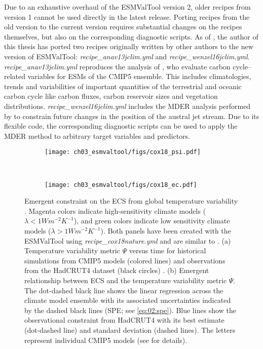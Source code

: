 Due to an exhaustive overhaul of the \ac{ESMValTool} version 2, older recipes
from version 1 \autocite{Eyring2016a} cannot be used directly in the latest
release. Porting recipes from the old version to the current version requires
substantial changes on the recipes themselves, but also on the corresponding
diagnostic scripts. As of \TheMonth{}, the author of this thesis has ported two
recipes originally written by other authors to the new version of
\ac{ESMValTool}: \emph{recipe\_anav13jclim.yml} and
\emph{recipe\_wenzel16jclim.yml}. \emph{recipe\_anav13jclim.yml} reproduces the
analysis of \textcite{Anav2013}, who evaluate carbon cycle--related variables
for \acp{ESM} of the \acs{CMIP}5 ensemble. This includes climatologies, trends
and variabilities of important quantities of the terrestrial and oceanic carbon
cycle like carbon fluxes, carbon reservoir sizes and vegetation distributions.
\emph{recipe\_wenzel16jclim.yml} includes the \ac{MDER} analysis performed by
\textcite{Wenzel2016a} to constrain future changes in the position of the
austral jet stream. Due to its flexible code, the corresponding diagnostic
scripts can be used to apply the \ac{MDER} method to arbitrary target variables
and predictors.

\begin{figure}[t]
  \centering
  \begin{subfigure}[b]{\SubfigureWidth{}}
    \texttt{[image: ch03\_esmvaltool/figs/cox18\_psi.pdf]}
    \caption{}
    \label{fig:03:cox18:a}
  \end{subfigure}
  ~
  \begin{subfigure}[b]{\SubfigureWidth{}}
    \texttt{[image: ch03\_esmvaltool/figs/cox18\_ec.pdf]}
    \caption{}
    \label{fig:03:cox18:b}
  \end{subfigure}
  \caption{Emergent constraint on the \acf{ECS} from global temperature
    variability \autocite{Cox2018}. Magenta colors indicate high-sensitivity
    climate models ($\lambda < 1 \unit{W m^{-2} K^{-1}}$), and green colors
    indicate low sensitivity climate models ($\lambda > 1 \unit{W m^{-2}
      K^{-1}}$). Both panels have been created with the \acs{ESMValTool} using
    \emph{recipe\_cox18nature.yml} and are similar to \textcite{Cox2018}. (a)
    Temperature variability metric $\Psi$ versus time for historical
    simulations from \acs{CMIP}5 models (colored lines) and observations from
    the HadCRUT4 dataset (black circles) \autocite{Morice2012}. (b) Emergent
    relationship between \acs{ECS} and the temperature variability metric
    $\Psi$. The dot-dashed black line shows the linear regression across the
    climate model ensemble with its associated uncertainties indicated by the
    dashed black lines (\acl{SPE}; see \cref{eq:02:spe}). Blue lines show the
    observational constraint from HadCRUT4 with its best estimate (dot-dashed
    line) and standard deviation (dashed lines). The letters represent
    individual \acs{CMIP}5 models (see \textcite{Cox2018} for details).}
  \label{fig:03:cox18}
\end{figure}

